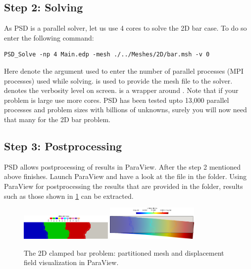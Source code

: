 \subsection{Step 2: Solving}

As PSD is a parallel solver, let us use 4 cores to solve the 2D bar
case. To do so enter the following command:

\begin{lstlisting}[style=BashInputStyle]
PSD_Solve -np 4 Main.edp -mesh ./../Meshes/2D/bar.msh -v 0
\end{lstlisting}

Here  denote the argument used to enter the number of
parallel processes (MPI processes) used while solving.
 is used to provide the mesh file to
the solver.  denotes the verbosity level on screen.
 is a wrapper around . Note that if
your problem is large use more cores. PSD has been tested upto 13,000
parallel processes and problem sizes with billions of unknowns, surely
you will now need that many for the 2D bar problem.

\subsection{Step 3: Postprocessing}

PSD allows postprocessing of results in ParaView. After the step 2
mentioned above finishes. Launch ParaView and have a look at the
 file in the  folder. Using ParaView for
postprocessing the results that are provided in the 
folder, results such as those shown in \cref{bar-le-full-mfront-pv} can
be extracted.

\begin{figure}[h!]
\centering
\includegraphics[align=t,width=0.4\textwidth]{./Images/le-2d-bar-partioned.png}\hfill
\includegraphics[align=t,width=0.4\textwidth]{./Images/le-2d-bar-results.png}
\caption{The 2D clamped bar problem: partitioned mesh and displacement field visualization in ParaView. \label{bar-le-full-mfront-pv}}
\end{figure}

